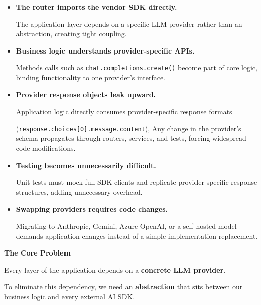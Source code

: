 \documentclass[11pt]{article}
\begin{document}
\begin{itemize}[leftmargin=0.45in,itemsep=0.18in]

\item \textbf{The router imports the vendor SDK directly.}

The application layer depends on a specific LLM provider rather than an abstraction, creating tight coupling.

\item \textbf{Business logic understands provider-specific APIs.}

Methods calls such as \texttt{chat.completions.create()} become part of core logic, binding functionality to one provider’s interface.

\item \textbf{Provider response objects leak upward.}

Application logic directly consumes provider‑specific response formats

(\texttt{response.choices[0].message.content}), Any change in the provider’s schema propagates through routers, services, and tests, forcing widespread code modifications.

\item \textbf{Testing becomes unnecessarily difficult.}

Unit tests must mock full SDK clients and replicate provider‑specific response structures, adding unnecessary overhead.

\item \textbf{Swapping providers requires code changes.}

Migrating to Anthropic, Gemini, Azure OpenAI, or a self‑hosted model demands application changes instead of a simple implementation replacement.

\end{itemize}

\vspace{0.25in}   %

\begin{tcolorbox}[
colback=brandlight,
colframe=brandblue,
arc=5pt,
boxrule=0.8pt,
left=10pt,
right=10pt,
top=8pt,
bottom=8pt
]

{\large\color{brandblue}\textbf{The Core Problem}}

Every layer of the application depends on a \textbf{concrete LLM provider}.

To eliminate this dependency, we need an \textbf{abstraction} that sits between our business logic and every external AI SDK.

\end{tcolorbox}
\end{document}
